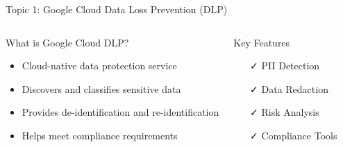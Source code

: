 \documentclass[aspectratio=169]{beamer}
\begin{document}
\begin{frame}{Topic 1: Google Cloud Data Loss Prevention (DLP)}
    \begin{columns}
        \begin{block}{What is Google Cloud DLP?}
            \begin{itemize}
                \item Cloud-native data protection service
                \item Discovers and classifies sensitive data
                \item Provides de-identification and re-identification
                \item Helps meet compliance requirements
            \end{itemize}
        \end{block}
        
        \begin{block}{Key Features}
            \begin{itemize}
                \item[\textcolor{googlegreen}{\faCheck}] PII Detection
                \item[\textcolor{googlegreen}{\faCheck}] Data Redaction
                \item[\textcolor{googlegreen}{\faCheck}] Risk Analysis
                \item[\textcolor{googlegreen}{\faCheck}] Compliance Tools
            \end{itemize}
        \end{block}
        
        \begin{center}
        \end{center}
    \end{columns}
\end{frame}
\end{document}
